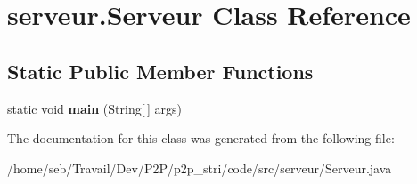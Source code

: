 \hypertarget{classserveur_1_1Serveur}{}\section{serveur.\+Serveur Class Reference}
\label{classserveur_1_1Serveur}
\subsection*{Static Public Member Functions}
\begin{DoxyCompactItemize}
\item 
\mbox{\label{classserveur_1_1Serveur_a1cf09998c1efabe4a9db7b454cfcbe69}} 
static void {\bfseries main} (String\mbox{[}$\,$\mbox{]} args)
\end{DoxyCompactItemize}


The documentation for this class was generated from the following file\+:\begin{DoxyCompactItemize}
\item 
/home/seb/\+Travail/\+Dev/\+P2\+P/p2p\+\_\+stri/code/src/serveur/Serveur.\+java\end{DoxyCompactItemize}
